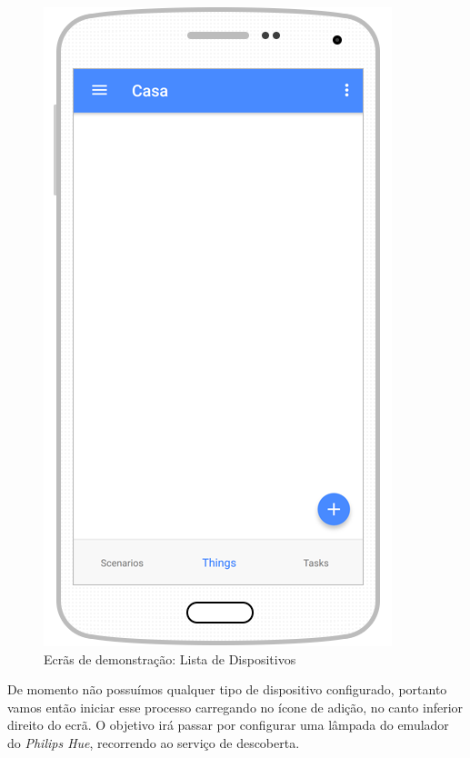 \begin{figure}[H]
  \centering
        \includegraphics[scale=0.6]{img/demo/list_things.png}
  \caption{Ecrãs de demonstração: Lista de Dispositivos}
\end{figure}

De momento não possuímos qualquer tipo de dispositivo configurado, portanto vamos então iniciar esse processo carregando no ícone de adição, no canto inferior direito do ecrã. O objetivo irá passar por configurar uma lâmpada do emulador do \textit{Philips Hue}, recorrendo ao serviço de descoberta.

